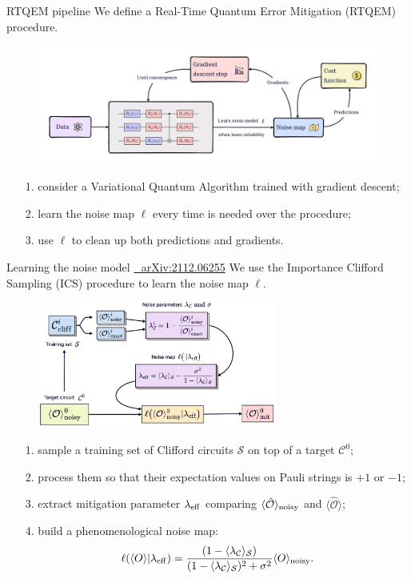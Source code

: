 \documentclass[8pt, xcolor={svgnames}, hyperref={linkcolor=black}]{beamer}
\begin{document}
\begin{frame}{RTQEM pipeline}
We define a Real-Time Quantum Error Mitigation (RTQEM) procedure.
\pause
\begin{figure}
    \includegraphics[width=1\textwidth]{figures/rtqem.pdf}
\end{figure}
\pause
\begin{itemize}[noitemsep]
\item[1.] consider a Variational Quantum Algorithm trained with gradient descent;
\pause
\item[2.] learn the noise map $\ell$ every time is needed over the procedure;
\pause
\item[3.] use $\ell$ to clean up both predictions and gradients.
\end{itemize}
\end{frame}

\begin{frame}{Learning the noise model \hfill \href{https://arxiv.org/abs/2112.06255}{\faBook\,\, arXiv:2112.06255}}
We use the Importance Clifford Sampling (ICS) procedure to learn the noise map $\ell$.
\pause
\begin{figure}
    \includegraphics[width=0.7\textwidth]{figures/ics_new.pdf}
\end{figure}
\pause
\begin{itemize}[noitemsep]
\item[1.] sample a training set of Clifford circuits $\mathcal{S}$ on top of a target $\mathcal{C}^0$;
\pause
\item[2.] process them so that their expectation values on Pauli strings is  $+1$ or $-1$;
\pause
\item[3.] extract mitigation parameter $\lambda_{\rm eff}$ comparing $\langle \hat{\mathcal{O}}\rangle_{\rm noisy}$ and $\langle \hat{\mathcal{O}}\rangle$;
\pause
\item[4.] build a phenomenological noise map:
$$ \ell(\langle O \rangle | \lambda_{\rm eff}) = \frac{(1 - \langle \lambda_{\mathcal{C}}
\rangle_{\mathcal{S}})}{(1 - \langle \lambda_{\mathcal{C}}\rangle_{\mathcal{S}})^2 
+ \sigma^2} \langle O \rangle_{\rm noisy}.$$
\end{itemize}
\end{frame}
\end{document}
